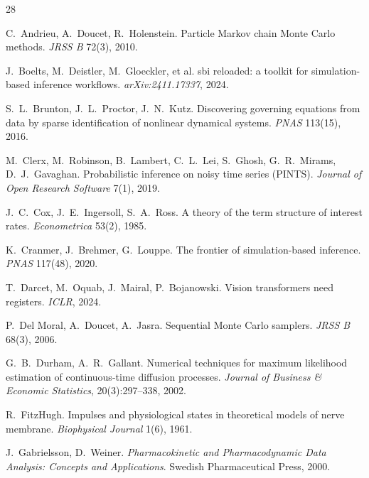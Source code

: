 \documentclass[10pt]{article}
\begin{document}
\clearpage
\setlength{\bibsep}{0.9pt plus 0.2ex}
\begin{thebibliography}{28}
\small\setlength{\itemsep}{0.9pt}\setlength{\parskip}{0pt}

 C.~Andrieu, A.~Doucet, R.~Holenstein.
Particle Markov chain Monte Carlo methods. \emph{JRSS B} 72(3), 2010.

 J.~Boelts, M.~Deistler, M.~Gloeckler, et al.
sbi reloaded: a toolkit for simulation-based inference workflows. \emph{arXiv:2411.17337}, 2024.

 S.~L.~Brunton, J.~L.~Proctor, J.~N.~Kutz.
Discovering governing equations from data by sparse identification of nonlinear dynamical systems.
\emph{PNAS} 113(15), 2016.

 M.~Clerx, M.~Robinson, B.~Lambert, C.~L.~Lei,
S.~Ghosh, G.~R.~Mirams, D.~J.~Gavaghan. Probabilistic inference on noisy time series (PINTS).
\emph{Journal of Open Research Software} 7(1), 2019.

 J.~C.~Cox, J.~E.~Ingersoll, S.~A.~Ross.
A theory of the term structure of interest rates. \emph{Econometrica} 53(2), 1985.

 K.~Cranmer, J.~Brehmer, G.~Louppe.
The frontier of simulation-based inference. \emph{PNAS} 117(48), 2020.

 T.~Darcet, M.~Oquab, J.~Mairal, P.~Bojanowski.
Vision transformers need registers. \emph{ICLR}, 2024.

 P.~Del Moral, A.~Doucet, A.~Jasra.
Sequential Monte Carlo samplers. \emph{JRSS B} 68(3), 2006.

 G.~B.~Durham, A.~R.~Gallant. Numerical
techniques for maximum likelihood estimation of continuous-time diffusion processes.
\emph{Journal of Business \& Economic Statistics}, 20(3):297--338, 2002.

 R.~FitzHugh. Impulses and physiological states in
theoretical models of nerve membrane. \emph{Biophysical Journal} 1(6), 1961.

 J.~Gabrielsson, D.~Weiner.
\emph{Pharmacokinetic and Pharmacodynamic Data Analysis: Concepts and Applications}. Swedish
Pharmaceutical Press, 2000.


\end{thebibliography}
\end{document}
